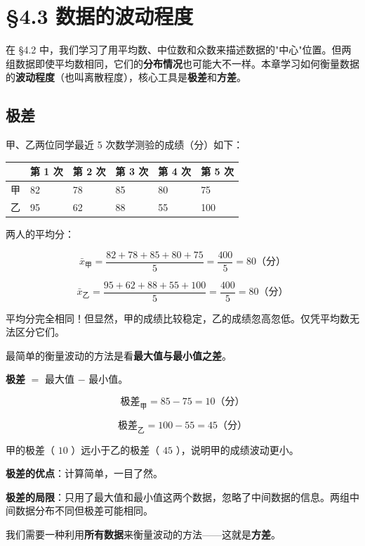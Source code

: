 \chapter{§4.3 数据的波动程度}
\label{sec:4.3}





在 §4.2 中，我们学习了用平均数、中位数和众数来描述数据的"中心"位置。但两组数据即使平均数相同，它们的\textbf{分布情况}也可能大不一样。本章学习如何衡量数据的\textbf{波动程度}（也叫离散程度），核心工具是\textbf{极差}和\textbf{方差}。



\section*{极差}


\begin{explore}


甲、乙两位同学最近 5 次数学测验的成绩（分）如下：

\begin{center}
\begin{tabular}{llllll}
\toprule
 & 第 1 次 & 第 2 次 & 第 3 次 & 第 4 次 & 第 5 次 \\
\midrule
甲 & 82 & 78 & 85 & 80 & 75 \\
乙 & 95 & 62 & 88 & 55 & 100 \\
\bottomrule
\end{tabular}
\end{center}


两人的平均分：

\[
\bar{x}_{\text{甲}} = \frac{82 + 78 + 85 + 80 + 75}{5} = \frac{400}{5} = 80 \text{（分）}
\]


\[
\bar{x}_{\text{乙}} = \frac{95 + 62 + 88 + 55 + 100}{5} = \frac{400}{5} = 80 \text{（分）}
\]


平均分完全相同！但显然，甲的成绩比较稳定，乙的成绩忽高忽低。仅凭平均数无法区分它们。

\end{explore}

\begin{understand}


最简单的衡量波动的方法是看\textbf{最大值与最小值之差}。

\textbf{极差} $=$ 最大值 $-$ 最小值。

\[
\text{极差}_{\text{甲}} = 85 - 75 = 10 \text{（分）}
\]


\[
\text{极差}_{\text{乙}} = 100 - 55 = 45 \text{（分）}
\]


甲的极差（ $10$ ）远小于乙的极差（ $45$ ），说明甲的成绩波动更小。

\textbf{极差的优点}：计算简单，一目了然。

\textbf{极差的局限}：只用了最大值和最小值这两个数据，忽略了中间数据的信息。两组中间数据分布不同但极差可能相同。

我们需要一种利用\textbf{所有数据}来衡量波动的方法——这就是\textbf{方差}。

\end{understand}

